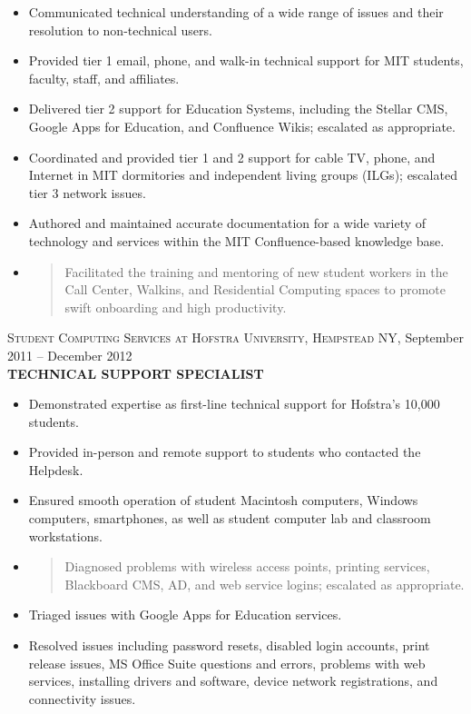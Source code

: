 \documentclass[]{article}
\begin{document}
\begin{itemize}
\item
  Communicated technical understanding of a wide range of issues and
  their resolution to non-technical users.
\item
  Provided tier 1 email, phone, and walk-in technical support for MIT
  students, faculty, staff, and affiliates.
\item
  Delivered tier 2 support for Education Systems, including the Stellar
  CMS, Google Apps for Education, and Confluence Wikis; escalated as
  appropriate.
\item
  Coordinated and provided tier 1 and 2 support for cable TV, phone, and
  Internet in MIT dormitories and independent living groups (ILGs);
  escalated tier 3 network issues.
\item
  Authored and maintained accurate documentation for a wide variety of
  technology and services within the MIT Confluence-based knowledge
  base.
\item
  \begin{quote}
  Facilitated the training and mentoring of new student workers in the
  Call Center, Walkins, and Residential Computing spaces to promote
  swift onboarding and high productivity.
  \end{quote}
\end{itemize}

\textsc{Student Computing Services at Hofstra University, Hempstead NY,}
September 2011 -- December 2012\\
\textbf{TECHNICAL SUPPORT SPECIALIST}

\begin{itemize}
\item
  Demonstrated expertise as first-line technical support for Hofstra's
  10,000 students.
\item
  Provided in-person and remote support to students who contacted the
  Helpdesk.
\item
  Ensured smooth operation of student Macintosh computers, Windows
  computers, smartphones, as well as student computer lab and classroom
  workstations.
\item
  \begin{quote}
  Diagnosed problems with wireless access points, printing services,
  Blackboard CMS, AD, and web service logins; escalated as appropriate.
  \end{quote}
\item
  Triaged issues with Google Apps for Education services.
\item
  Resolved issues including password resets, disabled login accounts,
  print release issues, MS Office Suite questions and errors, problems
  with web services, installing drivers and software, device network
  registrations, and connectivity issues.
\end{itemize}
\end{document}
